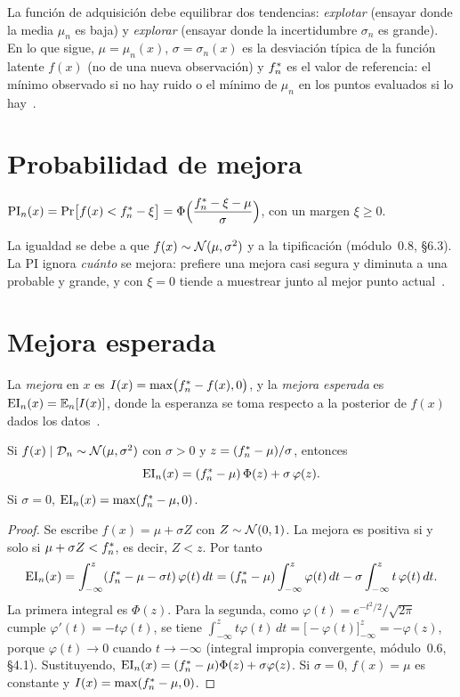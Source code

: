 La función de adquisición debe equilibrar dos tendencias: \emph{explotar} (ensayar donde la media $\mu_n$ es baja) y \emph{explorar} (ensayar donde la incertidumbre $\sigma_n$ es grande). En lo que sigue, $\mu=\mu_n(x)$, $\sigma=\sigma_n(x)$ es la desviación típica de la función latente $f(x)$ (no de una nueva observación) y $f^{*}_{n}$ es el valor de referencia: el mínimo observado si no hay ruido o el mínimo de $\mu_n$ en los puntos evaluados si lo hay~\cite[§5]{frazier}.

\section{Probabilidad de mejora}

\begin{definicion}\label{def:pi}
$\operatorname{PI}_n(x)=\Pr\bigl[f(x)<f^{*}_{n}-\xi\bigr]=\Phi\Bigl(\dfrac{f^{*}_{n}-\xi-\mu}{\sigma}\Bigr)$, con un margen $\xi\ge 0$.
\end{definicion}

La igualdad se debe a que $f(x)\sim\mathcal{N}(\mu,\sigma^2)$ y a la tipificación (módulo~0.8, §6.3). La PI ignora \emph{cuánto} se mejora: prefiere una mejora casi segura y diminuta a una probable y grande, y con $\xi=0$ tiende a muestrear junto al mejor punto actual~\cite[§7.5]{garnett}.

\section{Mejora esperada}

\begin{definicion}\label{def:ei}
La \emph{mejora} en $x$ es $I(x)=\max\bigl(f^{*}_{n}-f(x),0\bigr)$, y la \emph{mejora esperada} es $\operatorname{EI}_n(x)=\mathbb{E}_n[I(x)]$, donde la esperanza se toma respecto a la posterior de $f(x)$ dados los datos~\cite[ec.~(14)]{jones}.
\end{definicion}

\begin{teorema}\label{teo:ei}
Si $f(x)\mid\mathcal{D}_n\sim\mathcal{N}(\mu,\sigma^2)$ con $\sigma>0$ y $z=(f^{*}_{n}-\mu)/\sigma$, entonces
\[
\operatorname{EI}_n(x)=(f^{*}_{n}-\mu)\,\Phi(z)+\sigma\,\varphi(z).
\]
Si $\sigma=0$, $\operatorname{EI}_n(x)=\max(f^{*}_{n}-\mu,0)$.
\end{teorema}

\begin{proof}
Se escribe $f(x)=\mu+\sigma Z$ con $Z\sim\mathcal{N}(0,1)$. La mejora es positiva si y solo si $\mu+\sigma Z<f^{*}_{n}$, es decir, $Z<z$. Por tanto
\[
\operatorname{EI}_n(x)=\int_{-\infty}^{z}(f^{*}_{n}-\mu-\sigma t)\,\varphi(t)\,dt=(f^{*}_{n}-\mu)\int_{-\infty}^{z}\varphi(t)\,dt-\sigma\int_{-\infty}^{z}t\,\varphi(t)\,dt .
\]
La primera integral es $\Phi(z)$. Para la segunda, como $\varphi(t)=e^{-t^2/2}/\sqrt{2\pi}$ cumple $\varphi'(t)=-t\varphi(t)$, se tiene $\int_{-\infty}^{z}t\varphi(t)\,dt=\bigl[-\varphi(t)\bigr]_{-\infty}^{z}=-\varphi(z)$, porque $\varphi(t)\to0$ cuando $t\to-\infty$ (integral impropia convergente, módulo~0.6, §4.1). Sustituyendo, $\operatorname{EI}_n(x)=(f^{*}_{n}-\mu)\Phi(z)+\sigma\varphi(z)$. Si $\sigma=0$, $f(x)=\mu$ es constante y $I(x)=\max(f^{*}_{n}-\mu,0)$.
\end{proof}

